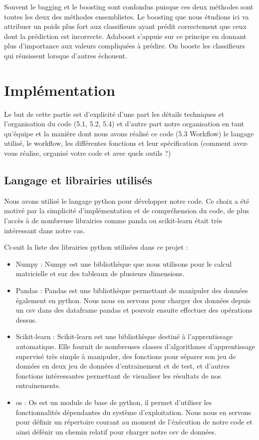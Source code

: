 \documentclass{article}
\begin{document}
Souvent le bagging et le boosting sont confondus puisque ces deux méthodes sont toutes les deux des méthodes ensemblistes. Le boosting que nous étudions ici va attribuer un poids plus fort aux classifieurs ayant prédit correctement que ceux dont la prédiction est incorrecte. Adaboost s'appuie sur ce principe en donnant plus d'importance aux valeurs compliquées à prédire. On booste les classifieurs qui réusissent lorsque d'autres échouent.


\section{Implémentation}
Le but de cette partie est d'explicité d'une part les détails techniques et l'organisation du code (5.1, 5.2, 5.4) et d'autre part notre organisation en tant qu'équipe et la manière dont nous avons réalisé ce code (5.3 Workflow)
le langage utilisé, le workflow, les différentes fonctions et leur spécification (comment avez-vous réalise, organisé votre code et avec quels outils ?)
\subsection{Langage et librairies utilisés}
Nous avons utilisé le langage python pour développer notre code. Ce choix a été motivé par la simplicité d'implémentation et de compréhension du code, de plus l'accès à de nombreuse librairies comme panda ou scikit-learn était très intéressant dans notre cas. 

Ci-suit la liste des librairies python utilisées dans ce projet : 
\begin{itemize}
  \item Numpy : Numpy est une bibliothèque que nous utilisons pour le calcul matricielle et sur des tableaux de plusieurs dimensions.
  \item Pandas : Pandas est une bibliothèque permettant de manipuler des données également en python. Nous nous en servons pour charger des données depuis un csv dans des dataframe pandas et pouvoir ensuite effectuer des opérations dessus.
  \item Scikit-learn : Scikit-learn est une bibliothèque destiné à l'apprentissage automatique. Elle fournit de nombreuses classes d'algorithmes d'apprentissage supervisé très simple à manipuler, des fonctions pour séparer son jeu de données en deux jeu de données d'entrainement et de test, et d'autres fonctions intéressantes permettant de visualiser les résultats de nos entrainements.
  \item os : Os est un module de base de python, il permet d'utiliser les fonctionnalités dépendantes du système d'exploitation. Nous nous en servons pour définir un répertoire courant au moment de l'éxécution de notre code et ainsi défénir un chemin relatif pour charger notre csv de données.
\end{itemize}
\end{document}
